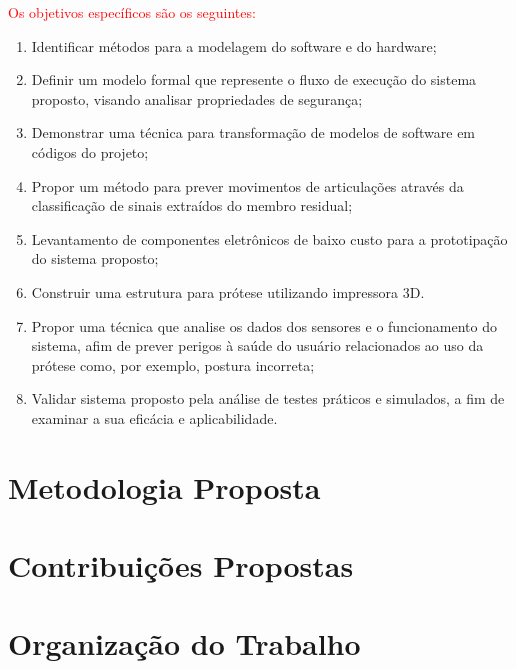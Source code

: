 
\textcolor{red}{Os objetivos específicos são os seguintes:}
\begin{enumerate}
  \item Identificar métodos para a modelagem do software e do hardware;
  \item Definir um modelo formal que represente o fluxo de execução do sistema proposto, visando analisar propriedades de segurança;
  \item Demonstrar uma técnica para transformação de modelos de software em códigos do projeto;
  \item Propor um método para prever movimentos de articulações através da classificação de sinais extraídos do membro residual;
  \item Levantamento de componentes eletrônicos de baixo custo para a prototipação do sistema proposto;
  \item Construir uma estrutura para prótese utilizando impressora 3D.
  \item Propor uma técnica que analise os dados dos sensores e o funcionamento do sistema, afim de prever perigos à saúde do usuário relacionados ao uso da prótese como, por exemplo, postura incorreta;
  \item Validar sistema proposto pela análise de testes práticos e simulados, a fim de examinar a sua eficácia e aplicabilidade.   
\end{enumerate}

\section{Metodologia Proposta}
\label{sec:metodologia}

\section{Contribuições Propostas}
\label{sec:contribuicoes}

\section{Organização do Trabalho}
\label{sec:organizacao}
